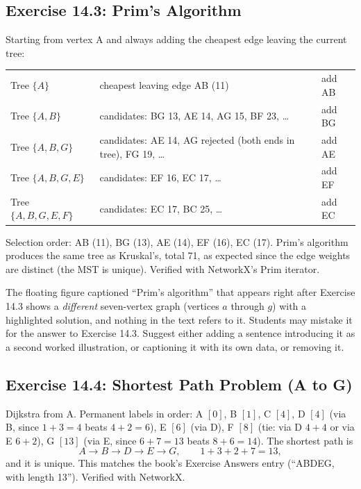 \subsection*{Exercise 14.3: Prim's Algorithm}

Starting from vertex A and always adding the cheapest edge leaving the current tree:
\begin{center}
\begin{tabular}{lll}
Tree $\{A\}$ & cheapest leaving edge AB (11) & add AB \\
Tree $\{A,B\}$ & candidates: BG 13, AE 14, AG 15, BF 23, \dots & add BG \\
Tree $\{A,B,G\}$ & candidates: AE 14, AG rejected (both ends in tree), FG 19, \dots & add AE \\
Tree $\{A,B,G,E\}$ & candidates: EF 16, EC 17, \dots & add EF \\
Tree $\{A,B,G,E,F\}$ & candidates: EC 17, BC 25, \dots & add EC \\
\end{tabular}
\end{center}
Selection order: AB (11), BG (13), AE (14), EF (16), EC (17). Prim's algorithm produces the same tree as Kruskal's, total 71, as expected since the edge weights are distinct (the MST is unique). Verified with NetworkX's Prim iterator.

\begin{qaflag}
The floating figure captioned ``Prim's algorithm'' that appears right after Exercise 14.3 shows a \emph{different} seven-vertex graph (vertices $a$ through $g$) with a highlighted solution, and nothing in the text refers to it. Students may mistake it for the answer to Exercise 14.3. Suggest either adding a sentence introducing it as a second worked illustration, or captioning it with its own data, or removing it.
\end{qaflag}

\subsection*{Exercise 14.4: Shortest Path Problem (A to G)}

Dijkstra from A. Permanent labels in order: A $[0]$, B $[1]$, C $[4]$, D $[4]$ (via B, since $1+3=4$ beats $4+2=6$), E $[6]$ (via D), F $[8]$ (tie: via D $4+4$ or via E $6+2$), G $[13]$ (via E, since $6+7=13$ beats $8+6=14$). The shortest path is
\[
A \to B \to D \to E \to G, \qquad 1 + 3 + 2 + 7 = 13,
\]
and it is unique. This matches the book's Exercise Answers entry (``ABDEG, with length 13''). Verified with NetworkX.

